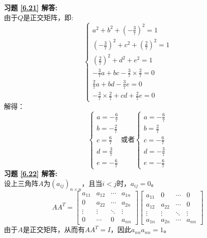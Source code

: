 \documentclass[a4paper]{book}
\begin{document}
\textbf{习题 \ref{6.21} 解答:}\\
由于$Q$是正交矩阵，即:
\begin{equation*}
\begin{cases}
  a^2+b^2+(-\frac{3}{7})^2 = 1 \\
  (-\frac{3}{7})^2+c^2+(\frac{2}{7})^2 = 1 \\
  (\frac{2}{7})^2+d^2+e^2 = 1 \\
  -\frac{3}{7}a+bc-\frac{3}{7}\times\frac{2}{7} = 0 \\
  \frac{2}{7}a+bd-\frac{3}{7}e = 0 \\
  -\frac{3}{7}\times\frac{2}{7}+cd+\frac{2}{7}e = 0
\end{cases}
\end{equation*}
解得：
\begin{equation*}
\begin{cases}
  a = -\frac{6}{7}\\
  b = -\frac{2}{7} \\
  c = \frac{6}{7} \\
  d = \frac{3}{7} \\
  e = -\frac{6}{7}
\end{cases}
\text{或者}
\begin{cases}
  a = -\frac{6}{7}\\
  b = \frac{2}{7} \\
  c = -\frac{6}{7} \\
  d = -\frac{3}{7} \\
  e = -\frac{6}{7}
\end{cases}
\end{equation*}
\textbf{习题 \ref{6.22} 解答:}\\
设上三角阵$A$为$(a_{ij})_{n\times n}$，且当$i<j$时，$a_{ij}=0$。
\begin{equation*}
  AA^T=\begin{bmatrix}
  a_{11}&a_{12}&\cdots&a_{1n}\\
  0&a_{22}&\cdots&a_{2n}\\
  \vdots&\vdots&\ddots&\vdots\\
  0&\cdots&0&a_{nn}
  \end{bmatrix}
  \begin{bmatrix}
  a_{11}&0&\cdots&0\\
  a_{12}&a_{22}&\cdots&0\\
  \vdots&\vdots&\ddots&\vdots\\
  a_{1n}&a_{2n}&\cdots&a_{nn}
  \end{bmatrix}
\end{equation*}
由于$A$是正交矩阵，从而有$AA^T=I$，因此$a_{nn}a_{nn}=1$。\\
\end{document}
